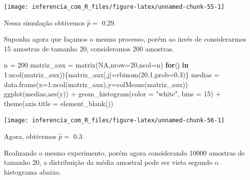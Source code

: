 \documentclass[
]{book}
\newenvironment{Shaded}{\begin{snugshade}}{\end{snugshade}}
\newcommand{\AttributeTok}[1]{\textcolor[rgb]{0.77,0.63,0.00}{#1}}
\newcommand{\ConstantTok}[1]{\textcolor[rgb]{0.00,0.00,0.00}{#1}}
\newcommand{\ControlFlowTok}[1]{\textcolor[rgb]{0.13,0.29,0.53}{\textbf{#1}}}
\newcommand{\DecValTok}[1]{\textcolor[rgb]{0.00,0.00,0.81}{#1}}
\newcommand{\FloatTok}[1]{\textcolor[rgb]{0.00,0.00,0.81}{#1}}
\newcommand{\FunctionTok}[1]{\textcolor[rgb]{0.00,0.00,0.00}{#1}}
\newcommand{\NormalTok}[1]{#1}
\newcommand{\OtherTok}[1]{\textcolor[rgb]{0.56,0.35,0.01}{#1}}
\newcommand{\SpecialCharTok}[1]{\textcolor[rgb]{0.00,0.00,0.00}{#1}}
\newcommand{\StringTok}[1]{\textcolor[rgb]{0.31,0.60,0.02}{#1}}
\begin{document}
\begin{center}\texttt{[image: inferencia\_com\_R\_files/figure-latex/unnamed-chunk-55-1]} \end{center}

Nessa simulação obtivemos \(\hat p =\) 0.29.

Suponha agora que façamos o mesmo processo, porém ao invés de considerarmos 15 amostras de tamanho 20, consideramos 200 amostras.

\begin{Shaded}
\begin{Highlighting}[]
\NormalTok{n }\OtherTok{=} \DecValTok{200}
\NormalTok{matriz\_aux }\OtherTok{=} \FunctionTok{matrix}\NormalTok{(}\ConstantTok{NA}\NormalTok{,}\AttributeTok{nrow=}\DecValTok{20}\NormalTok{,}\AttributeTok{ncol=}\NormalTok{n)}
\ControlFlowTok{for}\NormalTok{(j }\ControlFlowTok{in} \DecValTok{1}\SpecialCharTok{:}\FunctionTok{ncol}\NormalTok{(matriz\_aux))\{matriz\_aux[,j]}\OtherTok{=}\FunctionTok{rbinom}\NormalTok{(}\DecValTok{20}\NormalTok{,}\DecValTok{1}\NormalTok{,}\AttributeTok{prob=}\FloatTok{0.3}\NormalTok{)\}}
\NormalTok{medias }\OtherTok{=} \FunctionTok{data.frame}\NormalTok{(}\AttributeTok{x=}\DecValTok{1}\SpecialCharTok{:}\FunctionTok{ncol}\NormalTok{(matriz\_aux),}\AttributeTok{y=}\FunctionTok{colMeans}\NormalTok{(matriz\_aux))}
\FunctionTok{ggplot}\NormalTok{(medias,}\FunctionTok{aes}\NormalTok{(y)) }\SpecialCharTok{+}
  \FunctionTok{geom\_histogram}\NormalTok{(}\AttributeTok{color =} \StringTok{"white"}\NormalTok{, }\AttributeTok{bins =} \DecValTok{15}\NormalTok{) }\SpecialCharTok{+}
  \FunctionTok{theme}\NormalTok{(}\AttributeTok{axis.title =} \FunctionTok{element\_blank}\NormalTok{())}
\end{Highlighting}
\end{Shaded}

\begin{center}\texttt{[image: inferencia\_com\_R\_files/figure-latex/unnamed-chunk-56-1]} \end{center}

Agora, obtivemos \(\hat p =\) 0.3.

Realizando o mesmo experimento, porém agora considerando 10000 amostras de tamanho 20, a distribuição da média amostral pode ser vista segundo o histograma abaixo.
\end{document}
